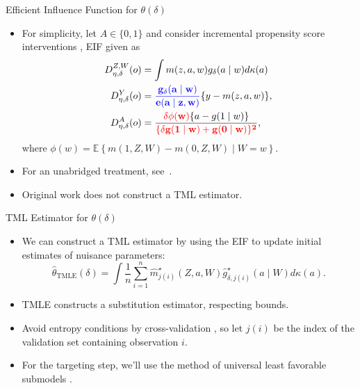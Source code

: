 \documentclass{beamer}
\begin{document}

\begin{frame}[c]{Efficient Influence Function for $\theta(\delta)$}

\begin{center}
\begin{itemize}
\itemsep2pt
\item For simplicity, let $A \in \{0, 1\}$ and consider incremental propensity
  score interventions \citep{kennedy2017nonparametric}, EIF given as
  \vspace{-0.5em}
  \begin{align*}
    D^{Z, W}_{\eta, \delta}(o) &= \int m(z, a, w) g_{\delta}(a \mid w)
      d\kappa(a)\\
    D^Y_{\eta, \delta}(o) &= \mathbf{\textcolor{blue}{\frac{g_{\delta}
    (a \mid w)} {e(a \mid z, w)}}} \{y - m(z,a,w) \},\\
    D^A_{\eta,\delta}(o) &= \frac{\mathbf{\textcolor{red}{\delta\phi(w)}}\{a -
      g(1 \mid w)\}}{\mathbf{\textcolor{red}{\{\delta g(1 \mid w) +
      g(0 \mid w)\}^2}}},
  \end{align*}
  where $\phi(w) = \mathbb{E}\left\{m(1, Z, W) - m(0, Z, W) \mid W = w
  \right\}$.
\item For an unabridged treatment, see~\cite{diaz2020causal}.
\item Original work does not construct a TML estimator.
\end{itemize}
\end{center}

\note{
}

\end{frame}


\begin{frame}[c]{TML Estimator for $\theta(\delta)$}

\begin{center}
\begin{itemize}
\itemsep2pt
\item We can construct a TML estimator by using the EIF to update initial
  estimates of nuisance parameters:
    \begin{equation*}
      \hat{\theta}_{\text{TMLE}}(\delta) = \int \frac{1}{n} \sum_{i=1}^n
      \hat{m}^{\star}_{j(i)}(Z, a, W)
      \hat{g}_{\delta, j(i)}^{\star}(a \mid W) d\kappa(a).
    \end{equation*}
  \item TMLE constructs a substitution estimator, respecting bounds.
  \item Avoid entropy conditions by cross-validation \citep{zheng2011cross,
    chernozhukov2016double}, so let $j(i)$ be the index of the validation set
    containing observation $i$.
  \item For the targeting step, we'll use the method of universal least
    favorable submodels \citep{vdl2016one}.
\end{itemize}
\end{center}

\note{
}

\end{frame}
\end{document}

